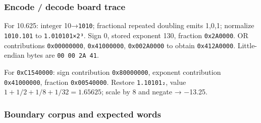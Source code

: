 \subsubsection{Encode / decode board trace}\label{appendix-92ff77d4dfdc-encode-decode-board-trace}

For 10.625: integer 10→\texttt{1010}; fractional repeated doubling emits 1,0,1; normalize \texttt{1010.101} to \texttt{1.010101×2³}. Sign 0, stored exponent 130, fraction \texttt{0x2A0000}. OR contributions \texttt{0x00000000}, \texttt{0x41000000}, \texttt{0x002A0000} to obtain \texttt{0x412A0000}. Little-endian bytes are \texttt{00\ 00\ 2A\ 41}.

For \texttt{0xC1540000}: sign contribution \texttt{0x80000000}, exponent contribution \texttt{0x41000000}, fraction \texttt{0x00540000}. Restore \texttt{1.10101₂}, value \(1+1/2+1/8+1/32=1.65625\); scale by 8 and negate → −13.25.

\subsubsection{Boundary corpus and expected words}\label{appendix-92ff77d4dfdc-boundary-corpus-and-expected-words}

